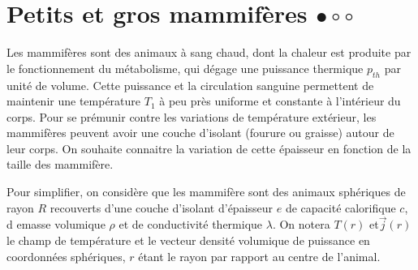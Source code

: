\documentclass{report}
\begin{document}
\section*{Petits et gros mammifères $\bullet\circ\circ$}

Les mammifères sont des animaux à sang chaud, dont la chaleur est produite par le fonctionnement du métabolisme, qui dégage une puissance thermique $p_{th}$ par unité de volume. Cette puissance et la circulation sanguine permettent de maintenir une température $T_1$ à peu près uniforme et constante à l'intérieur du corps. Pour se prémunir contre les variations de température extérieur, les mammifères peuvent avoir une couche d'isolant (fourure ou graisse) autour de leur corps. On souhaite connaitre la variation de cette épaisseur en fonction de la taille des mammifère. 

Pour simplifier, on considère que les mammifère sont des animaux sphériques de rayon $R$ recouverts d'une couche d'isolant d'épaisseur $e$ de capacité calorifique $c$, d emasse volumique $\rho$ et de conductivité thermique $\lambda$. On notera $T(r)$ et$\vec{j}(r)$ le champ de température et le vecteur densité volumique de puissance en coordonnées sphériques, $r$ étant le rayon par rapport au centre de l'animal.
\end{document}
